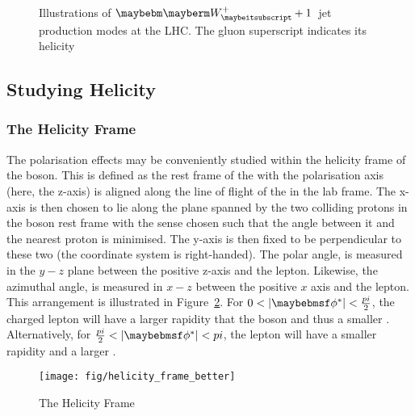 \begin{figure}
\centering
{}\quad
{}\quad
{}\\
\quad
{}\quad
{}
\caption{Illustrations of $\PWplus+1$~jet production modes at the LHC. The
  gluon superscript indicates its helicity}
\label{fig:w1jet_modes}
\end{figure}


\subsection{Studying Helicity}

\subsubsection{The Helicity Frame}
The polarisation effects may be conveniently studied within the helicity frame
of the \PW boson. This is defined as the rest frame of the \PW with the
polarisation axis (here, the z-axis) is aligned along the line of flight of the
\PW in the lab frame. The x-axis is then chosen to lie along the plane spanned
by the two colliding protons in the boson rest frame with the sense chosen such
that the angle between it and the nearest proton is minimised. The y-axis is
then fixed to be perpendicular to these two (the coordinate system is
right-handed). The polar angle, \thetastar is measured in the $y-z$ plane
between the positive z-axis and the lepton. Likewise, the azimuthal angle,
\phistar is measured in $x-z$ between the positive $x$ axis and the lepton. This
arrangement is illustrated in Figure~\ref{fig:wpol_helicity_frame}. For $0 <
|\phistar| < \frac{\pi}{2}$, the charged lepton will have a larger rapidity that
the \PW boson and thus a smaller \Pt. Alternatively, for $\frac{\pi}{2} <
|\phistar| < \pi$, the lepton will have a smaller rapidity and a larger \Pt.

\begin{figure}
\texttt{[image: fig/helicity\_frame\_better]}
\caption{The Helicity Frame \cite{berger_left_handed_w}}
\label{fig:wpol_helicity_frame}
\end{figure}

